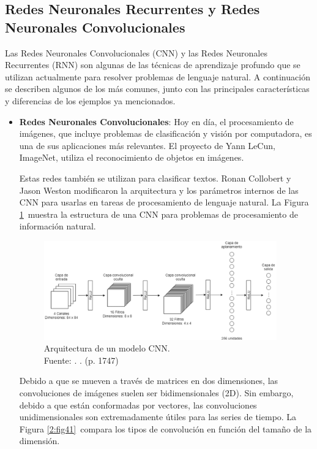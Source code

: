 \subsection{Redes Neuronales Recurrentes y Redes Neuronales Convolucionales}

Las Redes Neuronales Convolucionales (CNN) y las Redes Neuronales Recurrentes (RNN) son algunas de las técnicas de aprendizaje profundo que se utilizan actualmente para resolver problemas de lenguaje natural. A continuación se describen algunos de los más comunes, junto con las principales características y diferencias de los ejemplos ya mencionados.

\begin{itemize}
	\item \textbf{Redes Neuronales Convolucionales}: Hoy en día, el procesamiento de imágenes, que incluye problemas de clasificación y visión por computadora, es una de sus aplicaciones más relevantes. El proyecto de Yann LeCun, ImageNet, utiliza el reconocimiento de objetos en imágenes.
	
	Estas redes también se utilizan para clasificar textos. Ronan Collobert y Jason Weston modificaron la arquitectura y los parámetros internos de las CNN para usarlas en tareas de procesamiento de lenguaje natural. La Figura \ref{2:fig40} muestra la estructura de una CNN para problemas de procesamiento de información natural. \parencite{bk_kamath2019deeplearning_nlp_sr}
	\begin{figure}[!ht]
		\begin{center}
			\includegraphics[width=0.95\textwidth]{2/figures/cnn_nlp.png}
			\caption[Arquitectura de un modelo CNN]{Arquitectura de un modelo CNN.\\
			Fuente: \cite{tec_kim2014convolutional}. . (p. 1747)}
			\label{2:fig40}
		\end{center}
	\end{figure}
	
	Debido a que se mueven a través de matrices en dos dimensiones, las convoluciones de imágenes suelen ser bidimensionales (2D). Sin embargo, debido a que están conformadas por vectores, las convoluciones unidimensionales son extremadamente útiles para las series de tiempo. La Figura \ref{2:fig41} compara los tipos de convolución en función del tamaño de la dimensión. \parencite{bk_rao2019nlp_pytorch}


\end{itemize}
